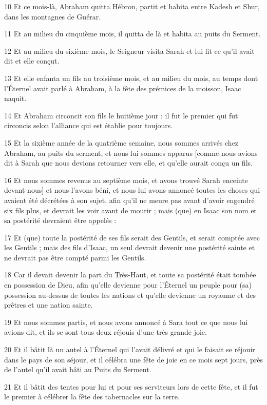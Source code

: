 \par 10 Et ce mois-là, Abraham quitta Hébron, partit et habita entre Kadesh et Shur, dans les montagnes de Guérar.
\par 11 Et au milieu du cinquième mois, il quitta de là et habita au puits du Serment.
\par 12 Et au milieu du sixième mois, le Seigneur visita Sarah et lui fit ce qu'il avait dit et elle conçut.
\par 13 Et elle enfanta un fils au troisième mois, et au milieu du mois, au temps dont l'Éternel avait parlé à Abraham, à la fête des prémices de la moisson, Isaac naquit.
\par 14 Et Abraham circoncit son fils le huitième jour : il fut le premier qui fut circoncis selon l'alliance qui est établie pour toujours.
\par 15 Et la sixième année de la quatrième semaine, nous sommes arrivés chez Abraham, au puits du serment, et nous lui sommes apparus [comme nous avions dit à Sarah que nous devions retourner vers elle, et qu'elle aurait conçu un fils.
\par 16 Et nous sommes revenus au septième mois, et avons trouvé Sarah enceinte devant nous] et nous l'avons béni, et nous lui avons annoncé toutes les choses qui avaient été décrétées à son sujet, afin qu'il ne meure pas avant d'avoir engendré six fils plus, et devrait les voir avant de mourir ; mais (que) en Isaac son nom et sa postérité devraient être appelés :
\par 17 Et (que) toute la postérité de ses fils serait des Gentils, et serait comptée avec les Gentils ; mais des fils d'Isaac, un seul devrait devenir une postérité sainte et ne devrait pas être compté parmi les Gentils.
\par 18 Car il devait devenir la part du Très-Haut, et toute sa postérité était tombée en possession de Dieu, afin qu'elle devienne pour l'Éternel un peuple pour (sa) possession au-dessus de toutes les nations et qu'elle devienne un royaume et des prêtres et une nation sainte.
\par 19 Et nous sommes partis, et nous avons annoncé à Sara tout ce que nous lui avions dit, et ils se sont tous deux réjouis d'une très grande joie.
\par 20 Et il bâtit là un autel à l'Éternel qui l'avait délivré et qui le faisait se réjouir dans le pays de son séjour, et il célébra une fête de joie en ce mois sept jours, près de l'autel qu'il avait bâti au Puits du Serment.
\par 21 Et il bâtit des tentes pour lui et pour ses serviteurs lors de cette fête, et il fut le premier à célébrer la fête des tabernacles sur la terre.
